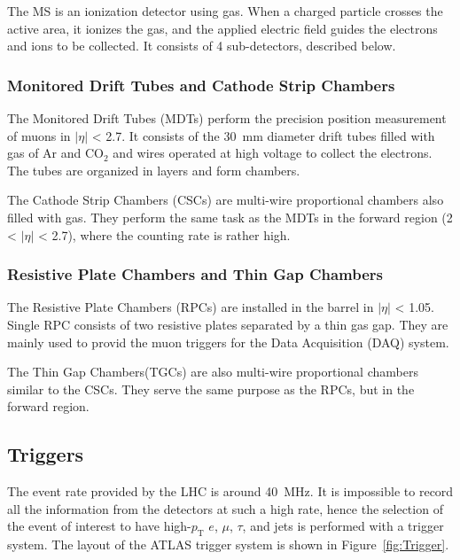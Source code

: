 The MS is an ionization detector using gas. When a charged particle crosses the active area, it ionizes the gas, and the applied electric field guides the electrons and ions to be collected. It consists of 4 sub-detectors, described below.

\subsubsection{Monitored Drift Tubes and Cathode Strip Chambers}
The Monitored Drift Tubes (MDTs) perform the precision position measurement of muons 
in $|\eta|$ < 2.7. It consists of the 30~mm diameter drift tubes filled with gas of Ar and CO$_2$ and wires operated at high voltage to collect the electrons.
The tubes are organized in layers and form chambers.

The Cathode Strip Chambers (CSCs) are multi-wire proportional chambers also filled with gas. They perform the same task as the MDTs in the forward region (2 < $|\eta|$ < 2.7), where the counting rate is rather high. 

\subsubsection{Resistive Plate Chambers and Thin Gap Chambers}
The Resistive Plate Chambers (RPCs) are installed in the barrel in  $|\eta|$ < 1.05. Single RPC consists of two resistive plates separated by a thin gas gap. They are mainly used to  provid the muon triggers for the Data Acquisition (DAQ) system.

The Thin Gap Chambers(TGCs) are also multi-wire proportional chambers similar to the CSCs. They serve the same purpose as the RPCs, but in the forward region. 

\subsection{Triggers}
The event rate provided by the LHC is around 40~MHz. It is impossible to record all the information from the detectors at such a high rate, hence the selection of the event of interest to have high-$p_\mathrm{T}$ $e$, $\mu$, $\tau$, and jets is performed with a trigger system. The layout of the ATLAS trigger system is shown in Figure~\ref{fig:Trigger}.


